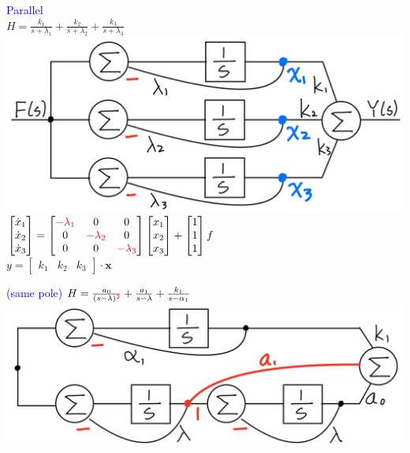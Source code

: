 \documentclass[4pt]{article}
\theoremstyle{definition}
\theoremstyle{definition}
\newcommand{\red}[1]{\textcolor{red}{#1}}
\newcommand{\blue}[1]{\textcolor{blue}{#1}}
\begin{document}
\begin{landscape}
\begin{multicols}{3}
    \blue{Parallel}\\
    \(H = \frac{k_1}{s+\lambda_1} + \frac{k_2}{s+\lambda_2} + \frac{k_3}{s+\lambda_3}\)\\
    \includegraphics[width=0.75\linewidth]{figures/parallel.png}
    \(
    \begin{bmatrix}
        \dot{x}_1\\
        \dot{x}_2\\
        \dot{x}_3\\
    \end{bmatrix}
    =
    \begin{bmatrix}
        \red{-\lambda_1} & 0 & 0\\
        0 & \red{-\lambda_2} & 0\\
        0 & 0 & \red{-\lambda_3}\\ 
    \end{bmatrix}
    \begin{bmatrix}
        x_1\\
        x_2\\
        x_3
    \end{bmatrix}
    +
    \begin{bmatrix}
        1\\1\\1         %
    \end{bmatrix}
    f
    \)\\

    \(y =
    \begin{bmatrix}
        k_1 & k_2 & k_3       %
    \end{bmatrix}
    \cdot \mathbf x
    \)

    \blue{(same pole)}                   
    \(H = \frac{a_0}{(s-\lambda)^{\red 2}} + \frac{a_1}{s-\lambda} + \frac{k_1}{s-\alpha_1}\)     
    \includegraphics[width=0.7\linewidth]{figures/multipole.png}


\end{multicols}
\end{landscape}
\end{document}
